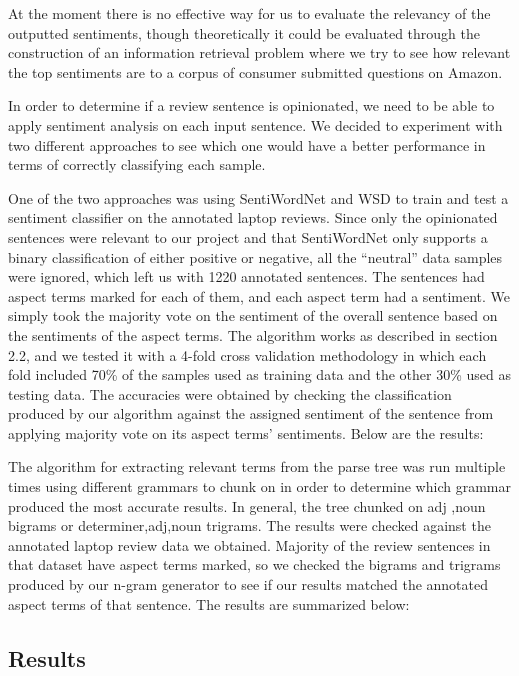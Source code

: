 \documentclass{article}
\begin{document}
At the moment there is no effective way for us to evaluate the relevancy of the outputted sentiments, though theoretically it could be evaluated through the construction of an information retrieval problem where we try to see how relevant the top sentiments are to a corpus of consumer submitted questions on Amazon.

In order to determine if a review sentence is opinionated, we need to be able to apply sentiment analysis on each input sentence. We decided to experiment with two different approaches to see which one would have a better performance in terms of correctly classifying each sample. 

One of the two approaches was using SentiWordNet and WSD to train and test a sentiment classifier on the annotated laptop reviews. Since only the opinionated sentences were relevant to our project and that SentiWordNet only supports a binary classification of either positive or negative, all the “neutral” data samples were ignored, which left us with 1220 annotated sentences. The sentences had aspect terms marked for each of them, and each aspect term had a sentiment. We simply took the majority vote on the sentiment of the overall sentence based on the sentiments of the aspect terms. The algorithm works as described in section 2.2, and we tested it with a 4-fold cross validation methodology in which each fold included 70\% of the samples used as training data and the other 30\% used as testing data. The accuracies were obtained by checking the classification produced by our algorithm against the assigned sentiment of the sentence from applying majority vote on its aspect terms’ sentiments. Below are the results:

The algorithm for extracting relevant terms from the parse tree was run multiple times using different grammars to chunk on in order to determine which grammar produced the most accurate results. In general, the tree chunked on adj ,noun bigrams or determiner,adj,noun trigrams. The results were checked against the annotated laptop review data we obtained. Majority of the review sentences in that dataset have aspect terms marked, so we checked the bigrams and trigrams produced by our n-gram generator to see if our results matched the annotated aspect terms of that sentence. The results are summarized below: 


\subsection{Results}
\end{document}
